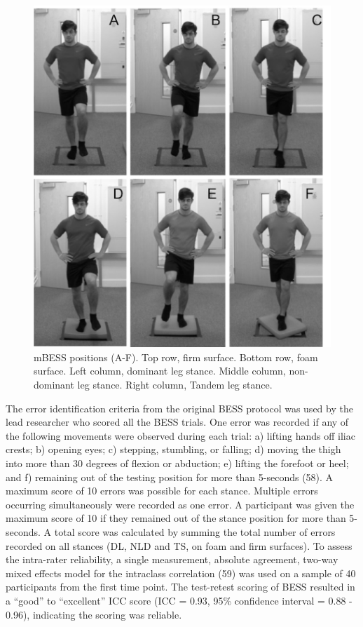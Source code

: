 \documentclass[
  english,
  man]{apa6}
\begin{document}
\begin{figure}[!h]

{\centering \includegraphics[width=1\linewidth]{figures_doc/Fig2} 

}

\caption{mBESS positions (A-F). Top row, firm surface. Bottom row, foam surface. Left column, dominant leg stance. Middle column, non-dominant leg stance. Right column, Tandem leg stance.}\label{fig:fig2}
\end{figure}

The error identification criteria from the original BESS protocol was used by the lead researcher who scored all the BESS trials.
One error was recorded if any of the following movements were observed during each trial: a) lifting hands off iliac crests;
b) opening eyes;
c) stepping, stumbling, or falling;
d) moving the thigh into more than 30 degrees of flexion or abduction;
e) lifting the forefoot or heel; and
f) remaining out of the testing position for more than 5-seconds (58).
A maximum score of 10 errors was possible for each stance. Multiple errors occurring simultaneously were recorded as one error.
A participant was given the maximum score of 10 if they remained out of the stance position for more than 5-seconds.
A total score was calculated by summing the total number of errors recorded on all stances (DL, NLD and TS, on foam and firm surfaces).
To assess the intra-rater reliability, a single measurement, absolute agreement, two-way mixed effects model for the intraclass correlation (59) was used on a sample of 40 participants from the first time point.
The test-retest scoring of BESS resulted in a ``good'' to ``excellent'' ICC score (ICC = 0.93, 95\% confidence interval = 0.88 - 0.96), indicating the scoring was reliable.
\end{document}
